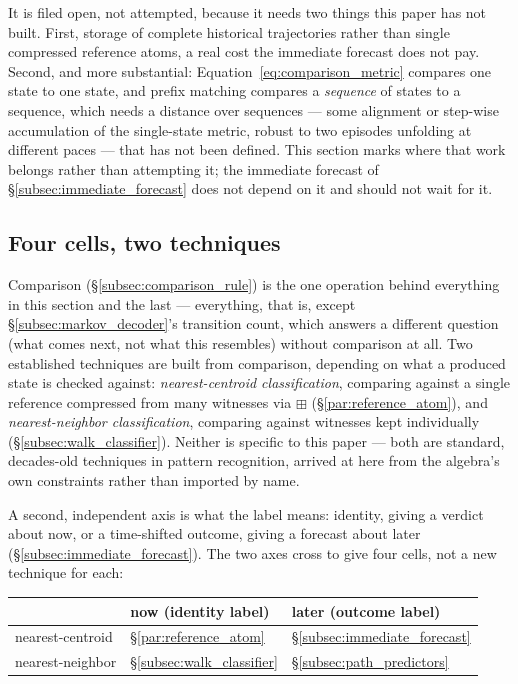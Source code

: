 \documentclass[12pt, a4paper]{article}
\begin{document}
It is filed open, not attempted, because it needs two things this
paper has not built. First, storage of complete historical
trajectories rather than single compressed reference atoms, a real
cost the immediate forecast does not pay. Second, and more
substantial: Equation~\eqref{eq:comparison_metric} compares one state
to one state, and prefix matching compares a \emph{sequence} of states
to a sequence, which needs a distance over sequences --- some
alignment or step-wise accumulation of the single-state metric,
robust to two episodes unfolding at different paces --- that has not
been defined. This section marks where that work belongs rather than
attempting it; the immediate forecast of
\S\ref{subsec:immediate_forecast} does not depend on it and should not
wait for it.

\subsection{Four cells, two techniques}
\label{subsec:four_cells}

Comparison (\S\ref{subsec:comparison_rule}) is the one operation
behind everything in this section and the last --- everything, that
is, except \S\ref{subsec:markov_decoder}'s transition count, which
answers a different question (what comes next, not what this
resembles) without comparison at all. Two established
techniques are built from comparison, depending on what a produced
state is checked against: \emph{nearest-centroid classification},
comparing against a single reference compressed from many witnesses
via $\boxplus$ (\S\ref{par:reference_atom}), and
\emph{nearest-neighbor classification}, comparing against witnesses
kept individually (\S\ref{subsec:walk_classifier}). Neither is
specific to this paper --- both are standard, decades-old techniques
in pattern recognition, arrived at here from the algebra's own
constraints rather than imported by name.

A second, independent axis is what the label means: identity, giving
a verdict about now, or a time-shifted outcome, giving a forecast
about later (\S\ref{subsec:immediate_forecast}). The two axes cross
to give four cells, not a new technique for each:

\begin{center}
\begin{tabular}{lll}
\hline
 & now (identity label) & later (outcome label) \\
\hline
nearest-centroid &
  \S\ref{par:reference_atom} &
  \S\ref{subsec:immediate_forecast} \\
nearest-neighbor &
  \S\ref{subsec:walk_classifier} &
  \S\ref{subsec:path_predictors} \\
\hline
\end{tabular}
\end{center}
\end{document}
